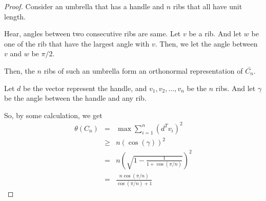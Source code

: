 \documentclass{article}
\begin{document}
      \begin{proof}
            Consider an umbrella that has a handle and $n$ ribs that all have unit length.

      
            Hear, angles between two consecutive ribs are same. Let $v$ be a rib. And let $w$ be one of the rib that have the largest angle with $v$. Then, we let the angle between $v$ and $w$ be $ \pi/2 $.

            Then, the $n$ ribs of such an umbrella form an orthonormal representation of $\bar{C_{n}}$.

            Let $d$ be the vector represent the handle, and $v_{1},v_{2},\dots,v_{n}$ be the $n$ ribs. And let $\gamma$ be the angle between the handle and any rib.

            So, by some calculation, we get
            \begin{eqnarray}
                  \theta(C_{n}) &=& \max \sum_{i=1}^{n}(d^{T}v_{i})^{2} \\
                  &\ge& n\left(
                        \cos(\gamma)
                  \right)^{2} \\
                  &=& n\left(
                        \sqrt{
                              1-\frac{1}{1+\cos(\pi/n)}
                        }
                  \right)^{2} \\
                  &=& \frac{n\cos(\pi/n)}{
                        \cos(\pi/n)+1
                  }
            \end{eqnarray}
      \end{proof}
\end{document}
